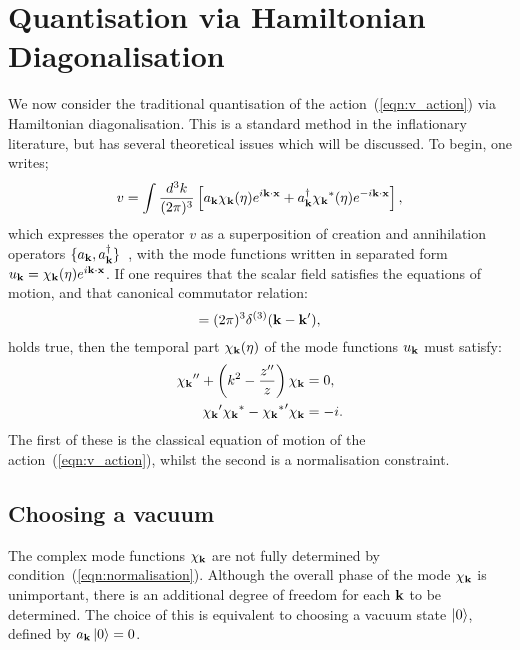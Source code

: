 \section{Quantisation via Hamiltonian Diagonalisation}                                
\label{sec:mukhanov}
We now consider the traditional quantisation of the action~(\ref{eqn:v_action}) via Hamiltonian diagonalisation. This is a standard method in the inflationary literature, but has several theoretical issues which will be discussed. To begin, one writes;
\begin{equation}
  v = \int \frac{d^3 k}{(2\pi)^3} \left[ a_{\mathbf{k}} \chi_{\mathbf{k}}(\eta)e^{i\mathbf{k}\cdot\mathbf{x}} + a_{\mathbf{k}}^{\dagger} {\chi_{\mathbf{k}}}^\ast(\eta)e^{-i\mathbf{k}\cdot\mathbf{x}} \right], 
  \label{eqn:v_quant}
\end{equation}
which expresses the operator $v$ as a superposition of creation and annihilation operators $\{a_{\mathbf{k}},a_{\mathbf{k}}^\dagger\}$~\cite{Mukhanov+2007}, with the mode functions written in separated form ${u_{\mathbf{k}} = \chi_{\mathbf{k}}(\eta) e^{i\mathbf{k}\cdot\mathbf{x}}}$. If one requires that the scalar field satisfies the equations of motion, and that canonical commutator relation:
\begin{equation}
  [ a_\vk^{\phantom\dagger} a_{\prm{\vk}}^{\dagger} ] = (2\pi)^3\delta^{(3)}(\vk-\prm{\vk}),
  \label{eqn:commutator}
\end{equation}
holds true, then the temporal part $\chi_{\mathbf{k}}(\eta)$ of the mode functions $u_{\mathbf{k}}$ must satisfy:
\begin{align}
  {{\chi_{\mathbf{k}}}^{\prime\prime}} + \left( k^2 - \frac{{{z}^{\prime\prime}}}{z} \right)\chi_{\mathbf{k}} &= 0,
  \label{eqn:mode_mukhanov}
  \\
  {{\chi_{\mathbf{k}}}^\prime} {\chi_{\mathbf{k}}}^\ast - {{{\chi_{\mathbf{k}}}^\ast}^\prime} \chi_{\mathbf{k}} &= -i.
  \label{eqn:normalisation}
\end{align}
The first of these is the classical equation of motion of the action~(\ref{eqn:v_action}), whilst the second is a normalisation constraint.

\subsection{Choosing a vacuum}
\label{sec:hamiltonian_diagonalisation}
The complex mode functions $\chi_{\mathbf{k}}$ are not fully determined by condition~(\ref{eqn:normalisation}). Although the overall phase of the mode $\chi_{\mathbf{k}}$ is unimportant, there is an additional degree of freedom for each $\mathbf{k}$ to be determined. The choice of this is equivalent to choosing a vacuum state $\left|0\right\rangle$, defined by $a_{\mathbf{k}}\left|0\right\rangle=0$.

